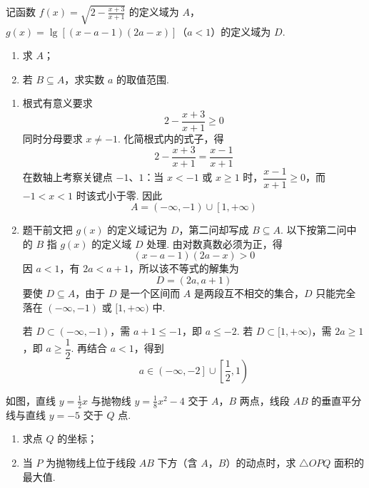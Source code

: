 \begin{problem}
记函数 \(f(x) = \sqrt{2 - \frac{x + 3}{x + 1}}\) 的定义域为 \(A\)，\(g(x) = \lg\left[\left(x - a - 1\right)\left(2a - x\right)\right]\)（\(a < 1\)）的定义域为 \(D\).

\begin{enumerate}
\item 求 \(A\)；
\item 若 \(B \subseteq A\)，求实数 \(a\) 的取值范围.
\end{enumerate}
\end{problem}

\begin{solution}
\begin{enumerate}
\item 根式有意义要求
\[
2-\frac{x+3}{x+1}\geqslant0
\]
同时分母要求 \(x\ne-1\). 化简根式内的式子，得
\[
2-\frac{x+3}{x+1}=\frac{x-1}{x+1}
\]
在数轴上考察关键点 \(-1\)、\(1\)：当 \(x<-1\) 或 \(x\geqslant1\) 时，\(\dfrac{x-1}{x+1}\geqslant0\)，而 \(-1<x<1\) 时该式小于零. 因此
\[
A=\left(-\infty,-1\right)\cup\left[1,+\infty\right)
\]

\item 题干前文把 \(g(x)\) 的定义域记为 \(D\)，第二问却写成 \(B\subseteq A\). 以下按第二问中的 \(B\) 指 \(g(x)\) 的定义域 \(D\) 处理. 由对数真数必须为正，得
\[
(x-a-1)(2a-x)>0
\]
因 \(a<1\)，有 \(2a<a+1\)，所以该不等式的解集为
\[
D=\left(2a,a+1\right)
\]
要使 \(D\subseteq A\)，由于 \(D\) 是一个区间而 \(A\) 是两段互不相交的集合，\(D\) 只能完全落在 \((-\infty,-1)\) 或 \([1,+\infty)\) 中.

若 \(D\subset(-\infty,-1)\)，需 \(a+1\leqslant-1\)，即 \(a\leqslant-2\). 若 \(D\subset[1,+\infty)\)，需 \(2a\geqslant1\)，即 \(a\geqslant\dfrac12\). 再结合 \(a<1\)，得到
\[
a\in\left(-\infty,-2\right]\cup\left[\frac12,1\right)
\]
\end{enumerate}
\end{solution}

\begin{problem}
如图，直线 \(y = \frac{1}{2}x\) 与抛物线 \(y = \frac{1}{8}x^2 - 4\) 交于 \(A\)，\(B\) 两点，线段 \(AB\) 的垂直平分线与直线 \(y = -5\) 交于 \(Q\) 点.

\begin{enumerate}
\item 求点 \(Q\) 的坐标；
\item 当 \(P\) 为抛物线上位于线段 \(AB\) 下方（含 \(A\)，\(B\)）的动点时，求 \(\triangle OPQ\) 面积的最大值.
\end{enumerate}

\end{problem}

